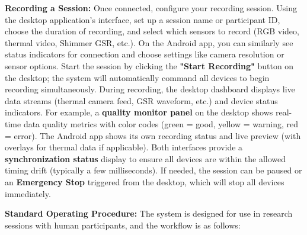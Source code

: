 \textbf{Recording a Session:} Once connected, configure your recording
session. Using the desktop application's interface, set up a session
name or participant ID, choose the duration of recording, and select
which sensors to record (RGB video, thermal video, Shimmer GSR,
etc.)\cite{ref17}.
On the Android app, you can similarly see status indicators for
connection and choose settings like camera resolution or sensor options.
Start the session by clicking the \textbf{"Start Recording"} button on the
desktop; the system will automatically command all devices to begin
recording simultaneously. During recording, the desktop dashboard
displays live data streams (thermal camera feed, GSR waveform, etc.) and
device status indicators. For example, a \textbf{quality monitor panel} on
the desktop shows real-time data quality metrics with color codes (green
= good, yellow = warning, red =
error)\cite{ref18}.
The Android app shows its own recording status and live preview (with
overlays for thermal data if applicable). Both interfaces provide a
\textbf{synchronization status} display to ensure all devices are within the
allowed timing drift (typically a few
milliseconds)\cite{ref19}.
If needed, the session can be paused or an \textbf{Emergency Stop} triggered
from the desktop, which will stop all devices
immediately\cite{ref18}.

\textbf{Standard Operating Procedure:} The system is designed for use in
research sessions with human participants, and the workflow is as
follows\cite{ref20}:

